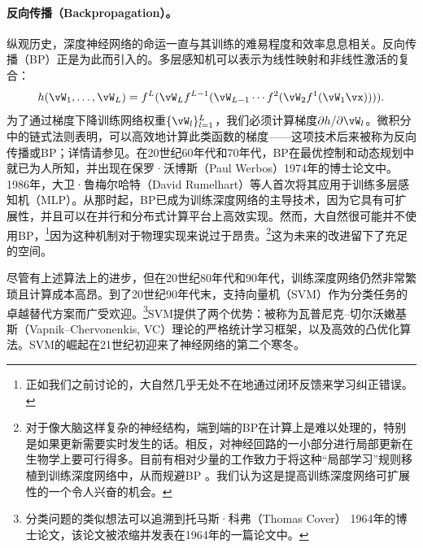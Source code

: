 \documentclass[../../book-main_zh.tex]{subfiles}
\begin{document}
\paragraph{反向传播（Backpropagation）。}
纵观历史，深度神经网络的命运一直与其训练的难易程度和效率息息相关。反向传播（BP）正是为此而引入的。多层感知机可以表示为线性映射和非线性激活的复合：
\begin{equation}
    h(\vW_{1}, \ldots, \vW_{L}) = f^{L}(\vW_{L}f^{L-1}(\vW_{L-1}
    \cdots f^{2}(\vW_{2}f^{1}(\vW_{1}\vx)))).
\end{equation}
为了通过梯度下降训练网络权重\(\{\vW_{l}\}_{l=1}^{L}\)，我们必须计算梯度\(\partial h/\partial
\vW_{l}\)。微积分中的链式法则表明，可以高效地计算此类函数的梯度——这项技术后来被称为反向传播或BP；详情请参见。在20世纪60年代和70年代，BP在最优控制和动态规划中就已为人所知，并出现在保罗·沃博斯（Paul
Werbos）1974年的博士论文中\cite{Werbos-1974, Werbos1994TheRO}。1986年，大卫·鲁梅尔哈特（David
Rumelhart）等人首次将其应用于训练多层感知机（MLP）\cite{Rumelhart1986}。从那时起，BP已成为训练深度网络的主导技术，因为它具有可扩展性，并且可以在并行和分布式计算平台上高效实现。然而，大自然很可能并不使用BP，\footnote{正如我们之前讨论的，大自然几乎无处不在地通过闭环反馈来学习纠正错误。}因为这种机制对于物理实现来说过于昂贵。\footnote{对于像大脑这样复杂的神经结构，端到端的BP在计算上是难以处理的，特别是如果更新需要实时发生的话。相反，对神经回路的一小部分进行局部更新在生物学上要可行得多。目前有相对少量的工作致力于将这种“局部学习”规则移植到训练深度网络中，从而规避BP
\cite{baldi2016theory,millidge2022predictive,li2025noprop}。我们认为这是提高训练深度网络可扩展性的一个令人兴奋的机会。}这为未来的改进留下了充足的空间。

尽管有上述算法上的进步，但在20世纪80年代和90年代，训练深度网络仍然非常繁琐且计算成本高昂。到了20世纪90年代末，支持向量机（SVM）\cite{SVM-1995}作为分类任务的卓越替代方案而广受欢迎。\footnote{分类问题的类似想法可以追溯到托马斯·科弗（Thomas
    Cover）
1964年的博士论文，该论文被浓缩并发表在1964年的一篇论文中\cite{Cover-1964}。}SVM提供了两个优势：被称为瓦普尼克--切尔沃嫩基斯（Vapnik--Chervonenkis, VC）理论的严格统计学习框架，以及高效的凸优化算法\cite{BoydVa04}。SVM的崛起在21世纪初迎来了神经网络的第二个寒冬。
\end{document}
